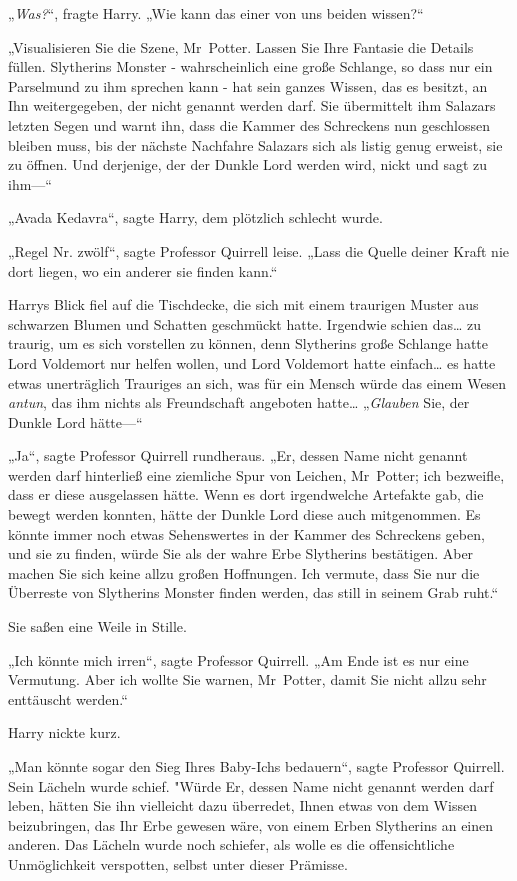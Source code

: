 {„\emph{Was?}“, fragte Harry. „Wie kann das einer von uns beiden wissen?“

„Visualisieren Sie die Szene, Mr~Potter. Lassen Sie Ihre Fantasie die Details füllen. Slytherins Monster - wahrscheinlich eine große Schlange, so dass nur ein Parselmund zu ihm sprechen kann - hat sein ganzes Wissen, das es besitzt, an Ihn weitergegeben, der nicht genannt werden darf. Sie übermittelt ihm Salazars letzten Segen und warnt ihn, dass die Kammer des Schreckens nun geschlossen bleiben muss, bis der nächste Nachfahre Salazars sich als listig genug erweist, sie zu öffnen. Und derjenige, der der Dunkle Lord werden wird, nickt und sagt zu ihm—“

„Avada Kedavra“, sagte Harry, dem plötzlich schlecht wurde.

„Regel Nr. zwölf“, sagte Professor Quirrell leise. „Lass die Quelle deiner Kraft nie dort liegen, wo ein anderer sie finden kann.“

Harrys Blick fiel auf die Tischdecke, die sich mit einem traurigen Muster aus schwarzen Blumen und Schatten geschmückt hatte. Irgendwie schien das… zu traurig, um es sich vorstellen zu können, denn Slytherins große Schlange hatte Lord Voldemort nur helfen wollen, und Lord Voldemort hatte einfach… es hatte etwas unerträglich Trauriges an sich, was für ein Mensch würde das einem Wesen \emph{antun}, das ihm nichts als Freundschaft angeboten hatte… „\emph{Glauben} Sie, der Dunkle Lord hätte—“

„Ja“, sagte Professor Quirrell rundheraus. „Er, dessen Name nicht genannt werden darf hinterließ eine ziemliche Spur von Leichen, Mr~Potter; ich bezweifle, dass er diese ausgelassen hätte. Wenn es dort irgendwelche Artefakte gab, die bewegt werden konnten, hätte der Dunkle Lord diese auch mitgenommen. Es könnte immer noch etwas Sehenswertes in der Kammer des Schreckens geben, und sie zu finden, würde Sie als der wahre Erbe Slytherins bestätigen. Aber machen Sie sich keine allzu großen Hoffnungen. Ich vermute, dass Sie nur die Überreste von Slytherins Monster finden werden, das still in seinem Grab ruht.“

Sie saßen eine Weile in Stille.

„Ich könnte mich irren“, sagte Professor Quirrell. „Am Ende ist es nur eine Vermutung. Aber ich wollte Sie warnen, Mr~Potter, damit Sie nicht allzu sehr enttäuscht werden.“

Harry nickte kurz.

„Man könnte sogar den Sieg Ihres Baby-Ichs bedauern“, sagte Professor Quirrell. Sein Lächeln wurde schief. "Würde Er, dessen Name nicht genannt werden darf leben, hätten Sie ihn vielleicht dazu überredet, Ihnen etwas von dem Wissen beizubringen, das Ihr Erbe gewesen wäre, von einem Erben Slytherins an einen anderen. Das Lächeln wurde noch schiefer, als wolle es die offensichtliche Unmöglichkeit verspotten, selbst unter dieser Prämisse.

}
